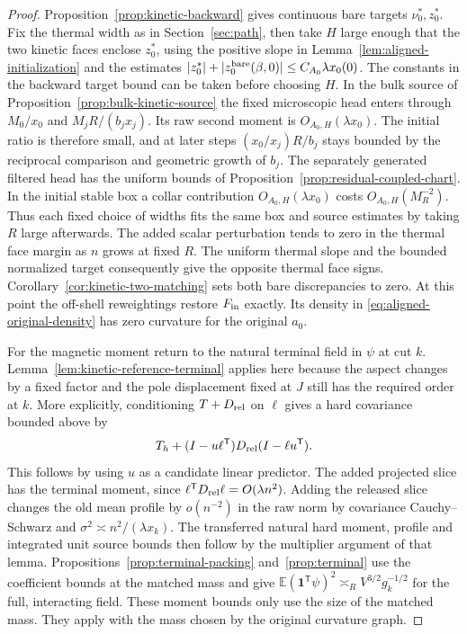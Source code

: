 \documentclass[11pt]{article}
\theoremstyle{definition}
\newcommand{\one}{\mathbf 1}
\newcommand{\E}{\mathbb E}
\begin{document}
\begin{proof}
Proposition~\ref{prop:kinetic-backward} gives continuous bare
targets \(\nu_0^*,z_0^*\). Fix the thermal width as in
Section~\ref{sec:path}, then take \(H\) large enough that the
two kinetic faces enclose \(z_0^*\), using the positive slope
in Lemma~\ref{lem:aligned-initialization} and the estimates
\(|z_0^*|+|z_0^{\rm bare}(\beta,0)|\le C_{A_0}\lambda x_0(0)\).
The constants in the backward target bound can be taken
before choosing \(H\). In the bulk source of
Proposition~\ref{prop:bulk-kinetic-source} the fixed microscopic
head enters through \(M_0/x_0\) and \(M_j R/(b_j x_j)\).
Its raw second moment is \(O_{A_0,H}(\lambda x_0)\).
The initial ratio is therefore small, and at later steps
\((x_0/x_j)R/b_j\) stays bounded by the reciprocal comparison
and geometric growth of \(b_j\). The separately generated
filtered head has the uniform bounds of
Proposition~\ref{prop:residual-coupled-chart}. In the initial
stable box a collar contribution \(O_{A_0,H}(\lambda x_0)\)
costs \(O_{A_0,H}(M_R^{-2})\). Thus each fixed choice of
widths fits the same box and source estimates by taking
\(R\) large afterwards. The added scalar perturbation tends
to zero in the thermal face margin as \(n\) grows at fixed \(R\).
The uniform thermal slope and
the bounded normalized target consequently give the opposite
thermal face signs. Corollary~\ref{cor:kinetic-two-matching}
sets both bare discrepancies to zero. At this point the
off-shell reweightings restore \(F_{\rm in}\) exactly. Its
density in \eqref{eq:aligned-original-density} has zero
curvature for the original \(a_0\).

For the magnetic moment return to the natural terminal field in
\(\psi\) at cut \(k\). Lemma~\ref{lem:kinetic-reference-terminal}
applies here because the aspect changes by a fixed factor and the
pole displacement fixed at \(J\) still has the required order at \(k\). More explicitly, conditioning
\(T+D_{\rm rel}\) on \(\ell\) gives a hard covariance bounded
above by
\begin{equation}
 T_h+(I-u\ell^{\mathsf T})D_{\rm rel}(I-\ell u^{\mathsf T}).
\end{equation}
This follows by using \(u\) as a candidate linear predictor.
The added projected slice has the terminal moment, since
\(\ell^{\mathsf T}D_{\rm rel}\ell=O(\lambda n^2)\). Adding the released slice
changes the old mean profile by \(o(n^{-2})\) in the raw norm by
covariance Cauchy--Schwarz and \(\sigma^2\asymp n^2/(\lambda x_k)\).
The transferred natural hard moment, profile and integrated
unit source bounds then follow by the multiplier argument of
that lemma. Propositions~\ref{prop:terminal-packing}
and~\ref{prop:terminal} use the coefficient bounds at the
matched mass and give
\(\E(\one^{\mathsf T}\psi)^2\asymp_R
V^{3/2}g_k^{-1/2}\) for the full, interacting field.
These moment bounds only use the size of the matched mass.
They apply with the mass chosen by the original curvature graph.


\end{proof}
\end{document}

